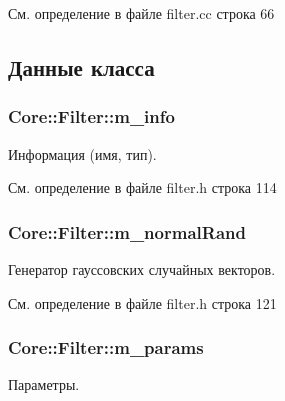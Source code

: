 См. определение в файле filter.\+cc строка 66



\subsection{Данные класса}
\subsubsection[{\texorpdfstring{m\+\_\+info}{m_info}}]{ Core\+::\+Filter\+::m\+\_\+info\hspace{0.3cm}{\ttfamily [protected]}}\hypertarget{class_core_1_1_filter_a089304c3d1695bd6b47d5bfd8fcfb574}{}\label{class_core_1_1_filter_a089304c3d1695bd6b47d5bfd8fcfb574}
Информация (имя, тип). 

См. определение в файле filter.\+h строка 114

\subsubsection[{\texorpdfstring{m\+\_\+normal\+Rand}{m_normalRand}}]{ Core\+::\+Filter\+::m\+\_\+normal\+Rand\hspace{0.3cm}{\ttfamily [protected]}}\hypertarget{class_core_1_1_filter_aec144b4ca46b58af15ae602a55312996}{}\label{class_core_1_1_filter_aec144b4ca46b58af15ae602a55312996}
Генератор гауссовских случайных векторов. 

См. определение в файле filter.\+h строка 121

\subsubsection[{\texorpdfstring{m\+\_\+params}{m_params}}]{ Core\+::\+Filter\+::m\+\_\+params\hspace{0.3cm}{\ttfamily [protected]}}\hypertarget{class_core_1_1_filter_ae4d42bb0f0e6299d4edbfc310e96d09f}{}\label{class_core_1_1_filter_ae4d42bb0f0e6299d4edbfc310e96d09f}
Параметры. 

